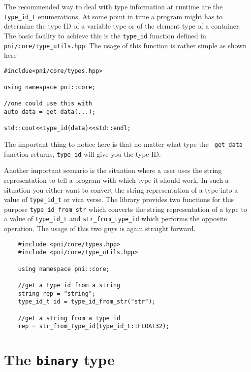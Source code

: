 The recommended way to deal with type information at runtime are the
{\tt type\_id\_t} enumerations.
At some point in time a program might has to determine the type ID of a variable
type or of the element type of a container.  The basic facility to achieve this
is the {\tt type\_id} function defined in {\tt pni/core/type\_utils.hpp}.  The
usage of this function is rather simple as shown here
\begin{verbatim}
#incldue<pni/core/types.hpp>

using namespace pni::core;

//one could use this with 
auto data = get_data(...);

std::cout<<type_id(data)<<std::endl;
\end{verbatim}
The important thing to notice here is that no matter what type the {\tt
get\_data} function returns, {\tt type\_id} will give you the type ID.

Another important scenario is the situation where a user uses the string
representation to tell a program with which type it should work. 
In such a situation you either want to convert the string representation of a
type into a value of {\tt type\_id\_t} or vica verse. The library provides two
functions for this purpose {\tt type\_id\_from\_str} which converts the string
representation of a type to a value of {\tt type\_id\_t} and 
{\tt str\_from\_type\_id} which performs the opposite operation. 
The usage of this two guys is again straight forward.
\begin{verbatim}
    #include <pni/core/types.hpp>
    #include <pni/core/type_utils.hpp>

    using namespace pni::core;

    //get a type id from a string
    string rep = "string";
    type_id_t id = type_id_from_str("str");

    //get a string from a type id
    rep = str_from_type_id(type_id_t::FLOAT32);
\end{verbatim}


\section{The {\tt binary} type}\label{section:using_binary}


